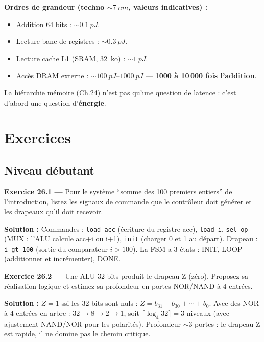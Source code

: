 \documentclass[12pt,a4paper,twoside]{book}
\begin{document}
\begin{intuition}
\textbf{Ordres de grandeur (techno $\sim\SI{7}{nm}$, valeurs indicatives) :}
\begin{itemize}[nosep]
\item Addition 64 bits : $\sim\SI{0.1}{pJ}$.
\item Lecture banc de registres : $\sim\SI{0.3}{pJ}$.
\item Lecture cache L1 (SRAM, \SI{32}{ko}) : $\sim\SI{1}{pJ}$.
\item Accès DRAM externe : $\sim\SI{100}{pJ}$--$\SI{1000}{pJ}$ --- \textbf{1000 à 10\,000 fois l'addition}.
\end{itemize}
La hiérarchie mémoire (Ch.24) n'est pas qu'une question de latence : c'est d'abord une question d'\textbf{énergie}.
\end{intuition}

\section*{Exercices}

\subsection*{Niveau débutant}

\textbf{Exercice 26.1 ---} Pour le système ``somme des 100 premiers entiers'' de l'introduction, listez les signaux de commande que le contrôleur doit générer et les drapeaux qu'il doit recevoir.

\begin{pratique}
\textbf{Solution :} Commandes : \texttt{load\_acc} (écriture du registre acc), \texttt{load\_i}, \texttt{sel\_op} (MUX : l'ALU calcule acc+i ou i+1), \texttt{init} (charger 0 et 1 au départ). Drapeau : \texttt{i\_gt\_100} (sortie du comparateur $i > 100$). La FSM a 3 états : INIT, LOOP (additionner et incrémenter), DONE.
\end{pratique}

\textbf{Exercice 26.2 ---} Une ALU 32 bits produit le drapeau Z (zéro). Proposez sa réalisation logique et estimez sa profondeur en portes NOR/NAND à 4 entrées.

\begin{pratique}
\textbf{Solution :} $Z = 1$ ssi les 32 bits sont nuls : $Z = \overline{b_{31} + b_{30} + \cdots + b_0}$. Avec des NOR à 4 entrées en arbre : $32 \to 8 \to 2 \to 1$, soit $\lceil\log_4 32\rceil = 3$ niveaux (avec ajustement NAND/NOR pour les polarités). Profondeur $\sim 3$ portes : le drapeau Z est rapide, il ne domine pas le chemin critique.
\end{pratique}
\end{document}
